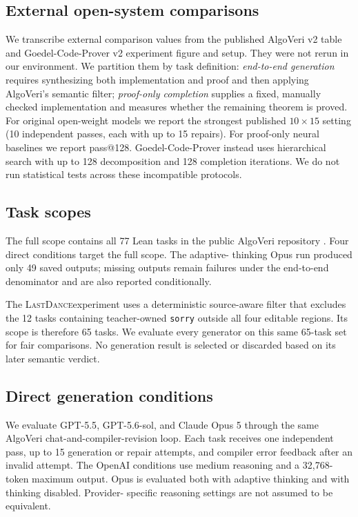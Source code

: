 \documentclass{article}
\newcommand{\model}[1]{\textsf{#1}}
\newcommand{\lastdance}{\textsc{LastDance}}
\begin{document}
\subsection{External open-system comparisons}

We transcribe external comparison values from the published AlgoVeri v2 table and
Goedel-Code-Prover v2 experiment figure and setup\cite{zhao2026algoveri,li2026goedelcodeprover}.
They were not rerun in our environment.  We partition them by task definition:
\emph{end-to-end generation} requires synthesizing both implementation and proof and
then applying AlgoVeri's semantic filter; \emph{proof-only completion} supplies a fixed,
manually checked implementation and measures whether the remaining theorem is proved.
For original open-weight models we report the strongest published $10\times15$ setting
(10 independent passes, each with up to 15 repairs).  For proof-only neural baselines we
report pass@128.  Goedel-Code-Prover instead uses hierarchical search with up to 128
decomposition and 128 completion iterations.  We do not run statistical tests across
these incompatible protocols.

\subsection{Task scopes}

The full scope contains all 77 Lean tasks in the public AlgoVeri repository
\cite{algoverirepo}.  Four direct conditions target the full scope.  The adaptive-
thinking Opus run produced only 49 saved outputs; missing outputs remain failures under
the end-to-end denominator and are also reported conditionally.

The \lastdance experiment uses a deterministic source-aware filter that
excludes the 12 tasks containing teacher-owned \texttt{sorry} outside all four editable
regions.  Its scope is therefore 65 tasks.  We evaluate every generator on this same
65-task set for fair comparisons.  No generation result is selected or discarded based
on its later semantic verdict.

\subsection{Direct generation conditions}

We evaluate \model{GPT-5.5}, \model{GPT-5.6-sol}, and \model{Claude Opus 5} through the
same AlgoVeri chat-and-compiler-revision loop.  Each task receives one independent pass,
up to 15 generation or repair attempts, and compiler error feedback after an invalid
attempt.  The OpenAI conditions use medium reasoning and a 32,768-token maximum output.
Opus is evaluated both with adaptive thinking and with thinking disabled.  Provider-
specific reasoning settings are not assumed to be equivalent.
\end{document}
